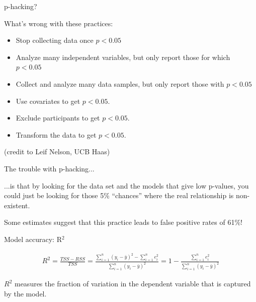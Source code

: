 \documentclass[aspectratio=169]{beamer}
\begin{document}
\begin{frame}{p-hacking?}

What's wrong with these practices:
\begin{itemize}
\item Stop collecting data once $p<0.05$
\item Analyze many independent variables, but only report those for which $p<0.05$
\item Collect and analyze many data samples, but only report those with $p<0.05$
\item  Use covariates to get $p<0.05$.
\item Exclude participants to get  $p<0.05$.
\item Transform the data to get  $p<0.05$.
\end{itemize}

(credit to Leif Nelson, UCB Haas)

\end{frame}

\begin{frame}{The trouble with p-hacking...}

...is that by looking for the data set and the models that give low p-values, you could just be looking for those 5\% ``chances'' where the real relationship is non-existent.

\vspace{5mm}\pause

Some estimates suggest that this practice leads to false positive rates of 61\%!

\end{frame}

\begin{frame}{Model accuracy: R$^2$}

\begin{align*}
R^2 = \frac{TSS - RSS}{TSS} = \frac{\sum_{i=1}^n (y_i-\bar{y})^2 - \sum_{i=1}^n e_i^2}{\sum_{i=1}^n (y_i-\bar{y})^2} = 1-\frac{\sum_{i=1}^n e_i^2}{\sum_{i=1}^n (y_i-\bar{y})^2} 
\end{align*}

\pause
$R^2$ measures the fraction of variation in the dependent variable that is captured by the model.  

\end{frame}
\end{document}
